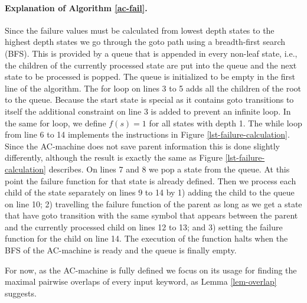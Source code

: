 \documentclass[english,twoside,censored,csm,algorithms-track-2020]{HYthesisML}
\theoremstyle{plain}
\theoremstyle{definition}
\begin{document}
  \paragraph{Explanation of Algorithm \ref{ac-fail}.}
  Since the failure values must be calculated from lowest depth states to the highest depth states
  we go through the goto path using a breadth-first search (BFS). This is provided by a queue that is
  appended in every non-leaf state, i.e., the children of the currently processed state are put into the
  queue and the next state to be processed is popped. The queue is initialized to be empty in the first
  line of the algorithm. The for loop on lines 3 to 5 adds all the children of the root to the queue.
  Because the start state is special as it contains goto transitions to itself the additional constraint
  on line 3 is added to prevent an infinite loop. In the same for loop, we define
  $f(s)=1$ for all states with depth 1. The while loop from line 6 to 14 implements the instructions
  in Figure \ref{lst-failure-calculation}. Since the AC-machine does not save parent information
  this is done slightly differently, although the result is exactly the same as Figure
  \ref{lst-failure-calculation} describes. On lines 7 and 8 we pop a
  state from the queue. At this point the failure function for that state is already defined. Then we
  process each child of the state separately on lines 9 to 14 by 1) adding the child to the
  queue  on line 10; 2) travelling the failure function of the parent as long as we get a state
  that have goto   transition with the same symbol that appears between the parent and the currently
  processed child on lines 12 to 13; and 3) setting the failure function for the child on line 14.
  The execution of the function halts when the BFS of the  AC-machine is ready and the queue is
  finally empty.

  For now, as the AC-machine is fully defined we focus on its usage for finding the maximal pairwise
  overlaps of every input keyword, as Lemma \ref{lem-overlap} suggests.
\end{document}
